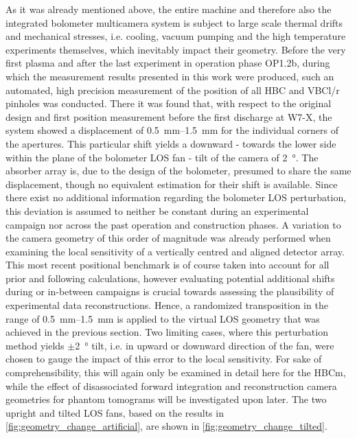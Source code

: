             As it was already mentioned above, the entire machine and therefore also the integrated bolometer multicamera system is subject to large scale thermal drifts and mechanical stresses, i.e. cooling, vacuum pumping and the high temperature experiments themselves, which inevitably impact their geometry. Before the very first plasma and after the last experiment in operation phase OP1.2b, during which the measurement results presented in this work were produced, such an automated, high precision measurement of the position of all HBC and VBCl/r pinholes was conducted. There it was found that, with respect to the original design and first position measurement before the first discharge at W7-X, the system showed a displacement of \SIrange{0.5}{1.5}{\milli\meter} for the individual corners of the apertures. This particular shift yields a downward - towards the lower side within the plane of the bolometer LOS fan - tilt of the camera of \SI{2}{\degree}. The absorber array is, due to the design of the bolometer, presumed to share the same displacement, though no equivalent estimation for their shift is available. Since there exist no additional information regarding the bolometer LOS perturbation, this deviation is assumed to neither be constant during an experimental campaign nor across the past operation and construction phases. A variation to the camera geometry of this order of magnitude was already performed when examining the local sensitivity of a vertically centred and aligned detector array. This most recent positional benchmark is of course taken into account for all prior and following calculations, however evaluating potential additional shifts during or in-between campaigns is crucial towards assessing the plausibility of experimental data reconstructions. Hence, a randomized transposition in the range of \SIrange{0.5}{1.5}{\milli\meter} is applied to the virtual LOS geometry that was achieved in the previous section. Two limiting cases, where this perturbation method yields $\pm$\SI{2}{\degree} tilt, i.e. in upward or downward direction of the fan, were chosen to gauge the impact of this error to the local sensitivity. For sake of comprehensibility, this will again only be examined in detail here for the HBCm, while the effect of disassociated forward integration and reconstruction camera geometries for phantom tomograms will be investigated upon later. The two upright and tilted LOS fans, based on the results in \cref{fig:geometry_change_artificial}, are shown in \cref{fig:geometry_change_tilted}.\\%
